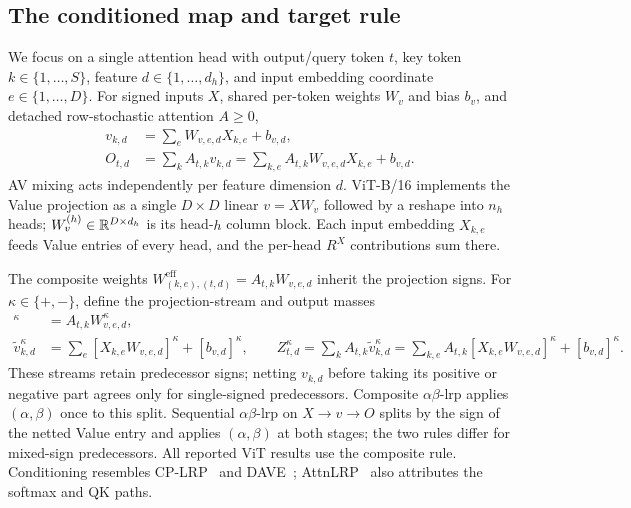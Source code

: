 \subsection{The conditioned map and target rule}\label{ptnb:app:attention-kl-routing}\label{ptnb:app:attention-target-rule}

We focus on a single attention head with output/query token $t$, key token $k\in\{1,\dots,S\}$, feature $d\in\{1,\dots,d_h\}$, and input embedding coordinate $e\in\{1,\dots,D\}$. For signed inputs $X$, shared per-token weights $W_v$ and bias $b_v$, and detached row-stochastic attention $A\ge0$,
\begin{align}
    v_{k,d}&=\sum_e W_{v,e,d}X_{k,e}+b_{v,d},\label{ptnb:eq:attn-V-forward}\\
    O_{t,d}&=\sum_k A_{t,k}v_{k,d}
      =\sum_{k,e}A_{t,k}W_{v,e,d}X_{k,e}+b_{v,d}.\label{ptnb:eq:attn-AV-forward}
\end{align}
AV mixing acts independently per feature dimension $d$. ViT-B/16 implements the Value projection as a single $D\times D$ linear $v=XW_v$ followed by a reshape into $n_h$ heads; $W_v^{(h)}\in\mathbb{R}^{D\times d_h}$ is its head-$h$ column block. Each input embedding $X_{k,e}$ feeds Value entries of every head, and the per-head $R^X$ contributions sum there.

The composite weights $W^{\mathrm{eff}}_{(k,e),(t,d)}=A_{t,k}W_{v,e,d}$ inherit the projection signs. For $\kappa\in\{+,-\}$, define the projection-stream and output masses
\begin{align}
    [W^{\mathrm{eff}}_{(k,e),(t,d)}]^\kappa
      &=A_{t,k}W_{v,e,d}^\kappa,\label{ptnb:eq:attn-composite-weight}\\
    \tilde v_{k,d}^\kappa&=\sum_e[X_{k,e}W_{v,e,d}]^\kappa+[b_{v,d}]^\kappa,
    \qquad
    Z_{t,d}^\kappa=\sum_k A_{t,k}\tilde v_{k,d}^\kappa
      =\sum_{k,e}A_{t,k}[X_{k,e}W_{v,e,d}]^\kappa+[b_{v,d}]^\kappa.
      \label{ptnb:eq:attn-Z-def}
\end{align}
These streams retain predecessor signs; netting $v_{k,d}$ before taking its positive or negative part agrees only for single-signed predecessors. Composite $\alpha\beta$-\ac{lrp} applies $(\alpha,\beta)$ once to this split. Sequential $\alpha\beta$-\ac{lrp} on $X\to v\to O$ splits by the sign of the netted Value entry and applies $(\alpha,\beta)$ at both stages; the two rules differ for mixed-sign predecessors. All reported ViT results use the composite rule. Conditioning resembles CP-LRP~\parencite{Ali2022AttnLRP} and DAVE~\parencite{Wrobel2024}; AttnLRP~\parencite{Achtibat2024AttnLRP} also attributes the softmax and QK paths.

